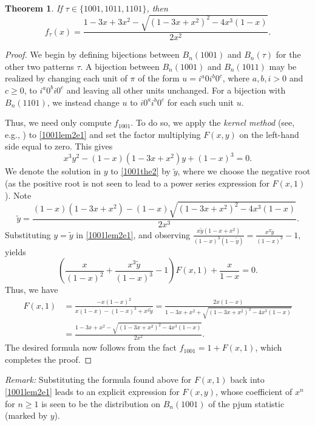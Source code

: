 \documentclass{article}
\theoremstyle{remark}
\theoremstyle{plain}
\newtheorem{theorem}{Theorem}[section]
\begin{document}
\begin{theorem}\label{1001th}
If $\tau\in\{1001,1011,1101\}$, then
\begin{equation}\label{1001the1}
f_\tau(x)=\frac{1-3x+3x^2-\sqrt{(1-3x+x^2)^2-4x^3(1-x)}}{2x^2}.
\end{equation}
\end{theorem}
\begin{proof}
We begin by defining bijections between $B_n(1001)$ and $B_n(\tau)$ for the other two patterns $\tau$.  A bijection between $B_n(1001)$ and $B_n(1011)$ may be realized by changing each unit of $\pi$ of the form $u=i^a0i^b0^c$, where $a,b,i>0$ and $c\geq0$, to $i^a0^bi0^c$ and leaving all other units unchanged.  For a bijection with $B_n(1101)$, we instead change $u$ to $i0^ai^b0^c$ for each such unit $u$.

Thus, we need only compute $f_{1001}$.  To do so, we apply the \emph{kernel method} (see, e.g., \cite{HM}) to \eqref{1001lem2e1} and set the factor multiplying $F(x,y)$ on the left-hand side equal to zero.  This gives
\begin{equation}\label{1001the2}
x^3y^2-(1-x)(1-3x+x^2)y+(1-x)^3=0.
\end{equation}
We denote the solution in $y$ to \eqref{1001the2} by $\widetilde{y}$, where we choose the negative root (as the positive root is not seen to lead to a power series expression for $F(x,1)$).  Note
$$\widetilde{y}=\frac{(1-x)(1-3x+x^2)-(1-x)\sqrt{(1-3x+x^2)^2-4x^3(1-x)}}{2x^3}.$$
Substituting $y=\widetilde{y}$ in \eqref{1001lem2e1}, and observing $\frac{x\widetilde{y}(1-x+x^2)}{(1-x)^3(1-\widetilde{y})}=\frac{x^3\widetilde{y}}{(1-x)^3}-1,$
yields
$$\left(\frac{x}{(1-x)^2}+\frac{x^3\widetilde{y}}{(1-x)^3}-1\right)F(x,1)+\frac{x}{1-x}=0.$$
Thus, we have
\begin{align*}
F(x,1)&=\frac{-x(1-x)^2}{x(1-x)-(1-x)^3+x^3\widetilde{y}}=\frac{2x(1-x)}{1-3x+x^2+\sqrt{(1-3x+x^2)^2-4x^3(1-x)}}\\
&=\frac{1-3x+x^2-\sqrt{(1-3x+x^2)^2-4x^3(1-x)}}{2x^2}.
\end{align*}
The desired formula now follows from the fact $f_{1001}=1+F(x,1)$, which completes the proof.
\end{proof}

\noindent \emph{Remark:} Substituting the formula found above for $F(x,1)$ back into \eqref{1001lem2e1} leads to an explicit expression for $F(x,y)$, whose coefficient of $x^n$ for $n \geq 1$ is seen to be the distribution on $B_n(1001)$ of the pjum statistic (marked by $y$).
\end{document}
